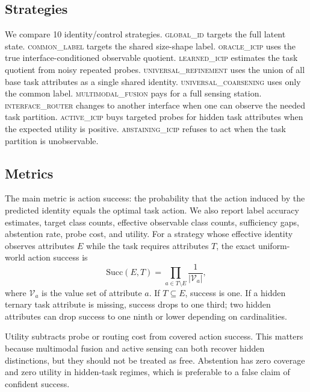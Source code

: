 \documentclass{article}
\newcommand{\method}[1]{\textsc{#1}}
\begin{document}
\subsection{Strategies}

We compare 10 identity/control strategies.
\method{global\_id} targets the full latent state.
\method{common\_label} targets the shared size-shape label.
\method{oracle\_icip} uses the true interface-conditioned observable quotient.
\method{learned\_icip} estimates the task quotient from noisy repeated probes.
\method{universal\_refinement} uses the union of all base task attributes as a single shared identity.
\method{universal\_coarsening} uses only the common label.
\method{multimodal\_fusion} pays for a full sensing station.
\method{interface\_router} changes to another interface when one can observe the needed task partition.
\method{active\_icip} buys targeted probes for hidden task attributes when the expected utility is positive.
\method{abstaining\_icip} refuses to act when the task partition is unobservable.

\subsection{Metrics}

The main metric is action success: the probability that the action induced by the predicted identity equals the optimal task action.
We also report label accuracy estimates, target class counts, effective observable class counts, sufficiency gaps, abstention rate, probe cost, and utility.
For a strategy whose effective identity observes attributes $E$ while the task requires attributes $T$, the exact uniform-world action success is
\begin{equation}
    \mathrm{Succ}(E,T) = \prod_{a\in T\setminus E} \frac{1}{|\mathcal{V}_a|},
\end{equation}
where $\mathcal{V}_a$ is the value set of attribute $a$.
If $T\subseteq E$, success is one.
If a hidden ternary task attribute is missing, success drops to one third; two hidden attributes can drop success to one ninth or lower depending on cardinalities.

Utility subtracts probe or routing cost from covered action success.
This matters because multimodal fusion and active sensing can both recover hidden distinctions, but they should not be treated as free.
Abstention has zero coverage and zero utility in hidden-task regimes, which is preferable to a false claim of confident success.
\end{document}
